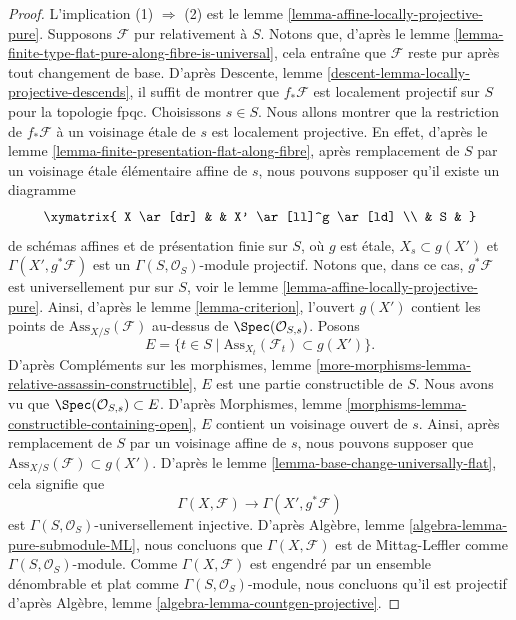 \begin{proof}
L'implication (1) $\Rightarrow$ (2) est le
lemme \ref{lemma-affine-locally-projective-pure}.
Supposons $\mathcal{F}$ pur relativement à $S$.
Notons que, d'après le
lemme \ref{lemma-finite-type-flat-pure-along-fibre-is-universal},
cela entraîne que $\mathcal{F}$ reste pur après tout changement de base. D'après
Descente, lemme \ref{descent-lemma-locally-projective-descends},
il suffit de montrer que $f_*\mathcal{F}$ est localement projectif sur $S$ pour la topologie fpqc.
Choisissons $s \in S$. Nous allons montrer que la restriction de
$f_*\mathcal{F}$ à un voisinage \'etale de $s$ est localement projective.
En effet, d'après le
lemme \ref{lemma-finite-presentation-flat-along-fibre},
après remplacement de $S$ par un voisinage \'etale élémentaire affine
de $s$, nous pouvons supposer qu'il existe un diagramme
$$
\xymatrix{
X \ar[dr] & & X' \ar[ll]^g \ar[ld] \\
& S &
}
$$
de schémas affines et de présentation finie sur $S$,
où $g$ est \'etale, $X_s \subset g(X')$ et
$\Gamma(X', g^*\mathcal{F})$ est un $\Gamma(S, \mathcal{O}_S)$-module projectif.
Notons que, dans ce cas, $g^*\mathcal{F}$ est universellement pur sur $S$, voir le
lemme \ref{lemma-affine-locally-projective-pure}.
Ainsi, d'après le
lemme \ref{lemma-criterion},
l'ouvert $g(X')$ contient les points de
$\text{Ass}_{X/S}(\mathcal{F})$ au-dessus de $\Spec(\mathcal{O}_{S, s})$.
Posons
$$
E = \{t \in S \mid \text{Ass}_{X_t}(\mathcal{F}_t) \subset g(X') \}.
$$
D'après
Compléments sur les morphismes,
lemme \ref{more-morphisms-lemma-relative-assassin-constructible},
$E$ est une partie constructible de $S$. Nous avons vu que
$\Spec(\mathcal{O}_{S, s}) \subset E$. D'après
Morphismes, lemme \ref{morphisms-lemma-constructible-containing-open},
$E$ contient un voisinage ouvert de $s$. Ainsi, après
remplacement de $S$ par un voisinage affine de $s$, nous pouvons supposer que
$\text{Ass}_{X/S}(\mathcal{F}) \subset g(X')$.
D'après le
lemme \ref{lemma-base-change-universally-flat},
cela signifie que
$$
\Gamma(X, \mathcal{F}) \longrightarrow \Gamma(X', g^*\mathcal{F})
$$
est $\Gamma(S, \mathcal{O}_S)$-universellement injective.
D'après Algèbre, lemme \ref{algebra-lemma-pure-submodule-ML},
nous concluons que $\Gamma(X, \mathcal{F})$ est de Mittag-Leffler comme
$\Gamma(S, \mathcal{O}_S)$-module. Comme
$\Gamma(X, \mathcal{F})$ est engendré par un ensemble dénombrable et plat comme
$\Gamma(S, \mathcal{O}_S)$-module, nous concluons
qu'il est projectif d'après
Algèbre, lemme \ref{algebra-lemma-countgen-projective}.
\end{proof}

